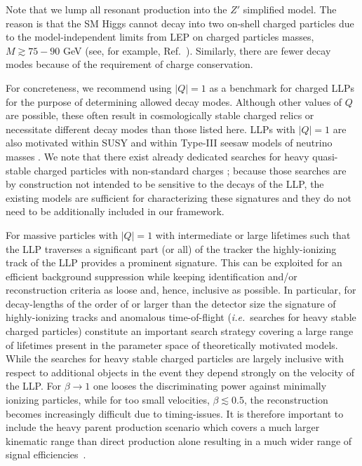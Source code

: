  Note that we lump all resonant production into the $Z'$ simplified model.  The reason is that the SM Higgs cannot decay into two on-shell charged particles due to the model-independent limits from LEP on charged particles masses, $M\gtrsim75-90$ GeV (see, for example, Ref.~\cite{Abbiendi:2003yd}).   Similarly, there are fewer decay modes because of the requirement of charge conservation. 

For concreteness, we recommend using $|Q|=1$ as a benchmark for charged LLPs for the purpose of determining allowed decay modes. 
Although other values of $Q$ are possible, these often result in cosmologically stable charged relics or necessitate different decay modes than those listed here.   LLPs with $|Q|=1$ are also motivated within SUSY \cite{Chen:1995yu,Thomas:1998wy,Feng:1999fu} and 
within Type-III seesaw models of neutrino masses \cite{Bajc:2006ia,Bajc:2007zf,Franceschini:2008pz,Arhrib:2009mz}.
We note that there exist already dedicated searches for heavy quasi-stable charged particles with non-standard charges \cite{Aad:2015kta,Khachatryan:2016sfv}; because those searches are by construction not intended to be sensitive to the decays of the LLP, the existing models are sufficient for characterizing these signatures and they do not need to be additionally included in our framework.

For massive particles with $|Q|=1$ with intermediate or large lifetimes such that the LLP traverses a significant part (or all) of the tracker the highly-ionizing track of the LLP provides a prominent signature. This can be exploited for an efficient background suppression while keeping identification and/or reconstruction criteria as loose and, hence, inclusive as possible. In particular, for decay-lengths of the order of or larger than the detector size the signature of highly-ionizing tracks and anomalous time-of-flight (\emph{i.e.}~searches for heavy stable charged particles) constitute an important search strategy covering a large range of lifetimes present in the parameter space of theoretically motivated models. While the searches for heavy stable charged particles are largely inclusive with respect to additional objects in the event they depend strongly on the velocity of the LLP\@. For $\beta\to1$ one looses the discriminating power against minimally ionizing particles, while for too small velocities, $\beta\lesssim0.5$, the reconstruction becomes increasingly difficult due to timing-issues. It is therefore important to include the heavy parent production scenario which covers a much larger kinematic range than direct production alone resulting in a much wider range of signal efficiencies~\cite{Heisig:2015yla}.


